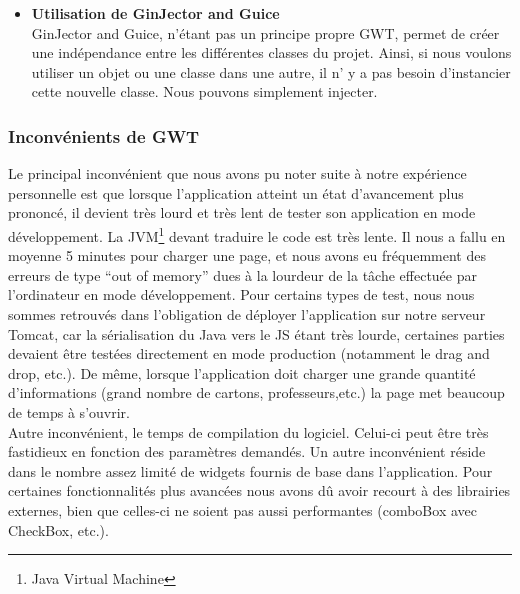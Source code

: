 \begin{itemize}
\item \textbf{Utilisation de GinJector and Guice}\\
GinJector and Guice, n'étant pas un principe propre GWT, permet de créer une indépendance entre les différentes classes du projet. Ainsi, si nous voulons utiliser un objet ou une classe dans une autre, il n' y a pas besoin d'instancier cette nouvelle classe. Nous pouvons simplement injecter.
\end{itemize}





\subsubsection{Inconvénients de GWT}
Le principal inconvénient que nous avons pu noter suite à notre expérience personnelle est que lorsque l'application atteint un état d'avancement plus prononcé, il devient très lourd et très lent de tester son application en mode développement. La JVM\footnote{Java Virtual Machine} devant traduire le code est très lente. Il nous a fallu en moyenne 5 minutes pour charger une page, et nous avons eu fréquemment des erreurs de type \enquote{out of memory} dues à la lourdeur de la tâche effectuée par l'ordinateur en mode développement.
\newline
\indent
Pour certains types de test, nous nous sommes retrouvés dans l'obligation de déployer l'application sur notre serveur Tomcat, car la sérialisation du Java vers le JS étant très lourde, certaines parties devaient être testées directement en mode production (notamment le drag and drop, etc.). 
\newline
\indent
De même, lorsque l'application doit charger une grande quantité d'informations (grand nombre de cartons, professeurs,etc.) la page met beaucoup de temps à s'ouvrir.\\
\newline
\indent
Autre inconvénient, le temps de compilation du logiciel. Celui-ci peut être très fastidieux en fonction des paramètres demandés. 
\newline
\indent
Un autre inconvénient réside dans le nombre assez limité de widgets fournis de base dans l'application. Pour certaines fonctionnalités plus avancées nous avons dû avoir recourt à des librairies externes, bien que celles-ci ne soient pas aussi performantes (comboBox avec CheckBox, etc.).

